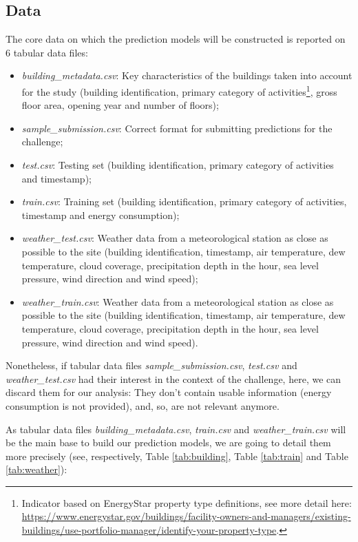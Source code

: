 \documentclass[twocolumn, switch]{article}
\begin{document}
\subsection{Data}

The core data on which the prediction models will be constructed is reported on $6$ tabular data files:
\begin{itemize}
\item \textit{building\_metadata.csv}: Key characteristics of the buildings taken into account for the study (building identification, primary category of activities\footnote{Indicator based on EnergyStar property type definitions, see more detail here: \url{https://www.energystar.gov/buildings/facility-owners-and-managers/existing-buildings/use-portfolio-manager/identify-your-property-type}.}, gross floor area, opening year and number of floors);
\item \textit{sample\_submission.csv}: Correct format for submitting predictions for the challenge;
\item \textit{test.csv}: Testing set (building identification, primary category of activities and timestamp);
\item \textit{train.csv}: Training set (building identification, primary category of activities, timestamp and energy consumption);
\item \textit{weather\_test.csv}: Weather data from a meteorological station as close as possible to the site (building identification, timestamp, air temperature, dew temperature, cloud coverage, precipitation depth in the hour, sea level pressure, wind direction and wind speed);
\item \textit{weather\_train.csv}: Weather data from a meteorological station as close as possible to the site (building identification, timestamp, air temperature, dew temperature, cloud coverage, precipitation depth in the hour, sea level pressure, wind direction and wind speed).
\end{itemize}

Nonetheless, if tabular data files \textit{sample\_submission.csv}, \textit{test.csv} and \textit{weather\_test.csv} had their interest in the context of the challenge, here, we can discard them for our analysis: They don't contain usable information (energy consumption is not provided), and, so, are not relevant anymore.

As tabular data files \textit{building\_metadata.csv}, \textit{train.csv} and \textit{weather\_train.csv} will be the main base to build our prediction models, we are going to detail them more precisely (see, respectively, Table \ref{tab:building}, Table \ref{tab:train} and Table \ref{tab:weather}):
\end{document}
